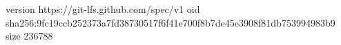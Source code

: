 version https://git-lfs.github.com/spec/v1
oid sha256:9fc19ccb252373a7fd38730517f6f41e700f8b7de45e3908f81db753994983b9
size 236788
